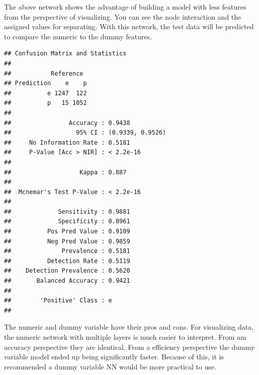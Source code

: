 \documentclass[
  english,
  man]{apa6}
\newenvironment{Shaded}{\begin{snugshade}}{\end{snugshade}}
\newcommand{\DataTypeTok}[1]{\textcolor[rgb]{0.13,0.29,0.53}{#1}}
\newcommand{\DecValTok}[1]{\textcolor[rgb]{0.00,0.00,0.81}{#1}}
\newcommand{\KeywordTok}[1]{\textcolor[rgb]{0.13,0.29,0.53}{\textbf{#1}}}
\newcommand{\NormalTok}[1]{#1}
\newcommand{\OperatorTok}[1]{\textcolor[rgb]{0.81,0.36,0.00}{\textbf{#1}}}
\newcommand{\StringTok}[1]{\textcolor[rgb]{0.31,0.60,0.02}{#1}}
\begin{document}
The above network shows the advantage of building a model with less features from the perspective of visualizing. You can see the node interaction and the assigned values for separating. With this network, the test data will be predicted to compare the numeric to the dummy features.

\begin{Shaded}
\end{Shaded}

\begin{verbatim}
## Confusion Matrix and Statistics
## 
##           Reference
## Prediction    e    p
##          e 1247  122
##          p   15 1052
##                                           
##                Accuracy : 0.9438          
##                  95% CI : (0.9339, 0.9526)
##     No Information Rate : 0.5181          
##     P-Value [Acc > NIR] : < 2.2e-16       
##                                           
##                   Kappa : 0.887           
##                                           
##  Mcnemar's Test P-Value : < 2.2e-16       
##                                           
##             Sensitivity : 0.9881          
##             Specificity : 0.8961          
##          Pos Pred Value : 0.9109          
##          Neg Pred Value : 0.9859          
##              Prevalence : 0.5181          
##          Detection Rate : 0.5119          
##    Detection Prevalence : 0.5620          
##       Balanced Accuracy : 0.9421          
##                                           
##        'Positive' Class : e               
## 
\end{verbatim}

The numeric and dummy variable have their pros and cons. For visualizing data, the numeric network with multiple layers is much easier to interpret. From am accuracy perspective they are identical. From a efficiency perspective the dummy variable model ended up being significantly faster. Because of this, it is recommended a dummy variable NN would be more practical to use.
\end{document}
